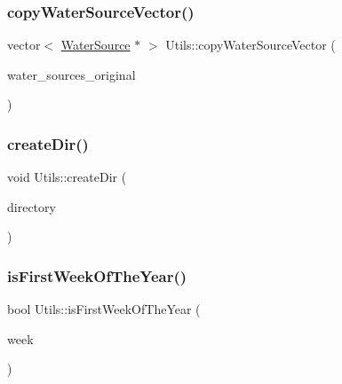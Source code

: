 \mbox{\label{classUtils_ad83b39de47909892725f2d9a8ee0ff1a}} 
\subsubsection{\texorpdfstring{copy\+Water\+Source\+Vector()}{copyWaterSourceVector()}}
{\footnotesize\ttfamily vector$<$ \mbox{\hyperlink{classWaterSource}{Water\+Source}} $\ast$ $>$ Utils\+::copy\+Water\+Source\+Vector (\begin{DoxyParamCaption}\item[{vector$<$ \mbox{\hyperlink{classWaterSource}{Water\+Source}} $\ast$$>$}]{water\+\_\+sources\+\_\+original }\end{DoxyParamCaption})\hspace{0.3cm}{\ttfamily [static]}}

\mbox{\label{classUtils_ad22978d5ae586f881920c2c2452436ce}} 
\subsubsection{\texorpdfstring{create\+Dir()}{createDir()}}
{\footnotesize\ttfamily void Utils\+::create\+Dir (\begin{DoxyParamCaption}\item[{string}]{directory }\end{DoxyParamCaption})\hspace{0.3cm}{\ttfamily [static]}}

\mbox{\label{classUtils_aea07106862ac4b17a93bb598952b5f3c}} 
\subsubsection{\texorpdfstring{is\+First\+Week\+Of\+The\+Year()}{isFirstWeekOfTheYear()}}
{\footnotesize\ttfamily bool Utils\+::is\+First\+Week\+Of\+The\+Year (\begin{DoxyParamCaption}\item[{int}]{week }\end{DoxyParamCaption})\hspace{0.3cm}{\ttfamily [static]}}

